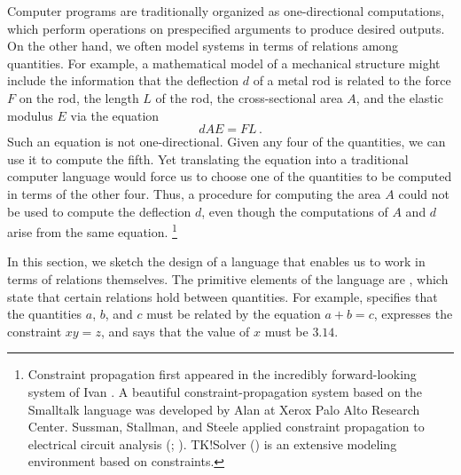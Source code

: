 Computer programs are traditionally organized as one-directional computations, which perform operations on prespecified arguments to produce desired outputs.
On the other hand, we often model systems in terms of relations among quantities.
For example, a mathematical model of a mechanical structure might include the information that the deflection \( d \) of a metal rod is related to the force \( F \) on the rod, the length \( L \) of the rod, the cross-sectional area \( A \), and the elastic modulus \( E \) via the equation
\[
	dAE = FL \,.
\]
Such an equation is not one-directional.
Given any four of the quantities, we can use it to compute the fifth.
Yet translating the equation into a traditional computer language would force us to choose one of the quantities to be computed in terms of the other four.
Thus, a procedure for computing the area \( A \) could not be used to compute the deflection \( d \), even though the computations of \( A \) and \( d \) arise from the same equation.%
\footnote{
	Constraint propagation first appeared in the incredibly forward-looking  system of Ivan .
	A beautiful constraint-propagation system based on the Smalltalk language was developed by Alan  at Xerox Palo Alto Research Center.
	Sussman, Stallman, and Steele applied constraint propagation to electrical circuit analysis (; ).
	TK!Solver () is an extensive modeling environment based on constraints.
}

In this section, we sketch the design of a language that enables us to work in terms of relations themselves.
The primitive elements of the language are , which state that certain relations hold between quantities.
For example,  specifies that the quantities \( a \), \( b \), and \( c \) must be related by the equation \( a + b = c \),  expresses the constraint \( xy = z \), and  says that the value of \( x \) must be \( 3.14 \).

